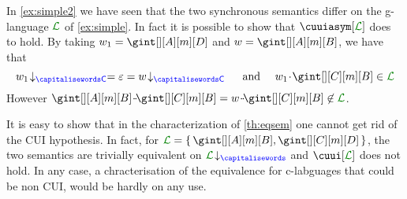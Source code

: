  \begin{example}
In \cref{ex:simple2} we have seen that the two synchronous semantics differ on the g-language 
$\clang$ of \cref{ex:simple}.
In fact it is possible to show that $\cuuiasym[{\clang}]$ does to hold.
By taking $\acword_1=\gint[][A][m][D]$ and $\acword=\gint[][A][m][B]$, we have that
$$\proj{\acword_1}{C}=\emptyword = \proj{\acword}{C} \quad\text{ and }\quad \acword_1\cat\gint[][C][m][B]\in\clang$$
However $\gint[][A][m][B]\cat\cat\gint[][C][m][B]= \acword\cat\cat\gint[][C][m][B]\not\in\clang$.
\finex
\end{example}

 
 It is easy to show that in the  characterization of \cref{th:eqsem}  one cannot get rid of the CUI hypothesis.
 In fact, for $\clang=\Set{\gint[][A][m][B], \gint[][C][m][D]}$, the two semantics are
 trivially equivalent on $\proj{\clang}{}$ and $\cuui[\clang]$ does not hold.
 In any case, a chracterisation of the equivalence for c-labguages that could be non CUI,
 would be hardly on any use.
 

